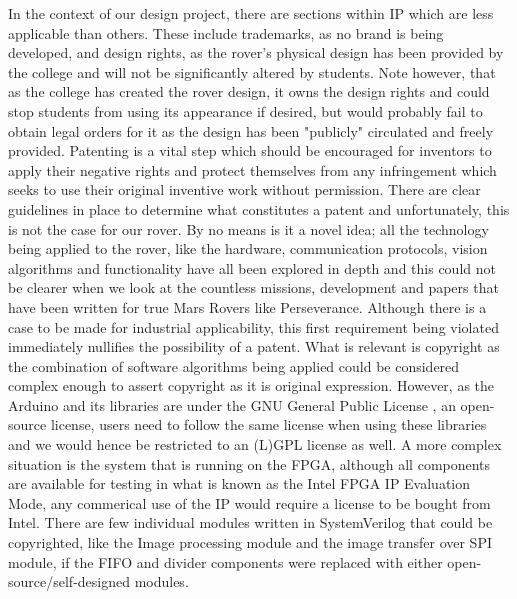 \documentclass[a4paper]{article}
\begin{document}
In the context of our design project, there are sections within IP which are less applicable than others. 
These include trademarks, as no brand is being developed, and design rights, as the rover's physical design has
been provided by the college and will not be significantly altered by students. Note however,
that as the college has created the rover design, it owns the design rights and could stop students
from using its appearance if desired, but would probably fail to obtain legal orders for it as the design
has been "publicly" circulated and freely provided.
Patenting is a vital step which should be encouraged for inventors to apply their negative rights and 
protect themselves from any infringement which seeks to use their original inventive work without permission. 
There are clear guidelines in place to determine what constitutes a patent and unfortunately, 
this is not the case for our rover. By no means is it a novel idea; all the technology being 
applied to the rover, like the hardware, communication protocols, vision algorithms and functionality 
have all been explored in depth and this could not be clearer when we look at the countless missions, 
development and papers that have been written for true Mars Rovers like Perseverance. 
Although there is a case to be made for industrial applicability, this first requirement being 
violated immediately nullifies the possibility of a patent. What is relevant is copyright as 
the combination of software algorithms being applied could be considered complex enough to assert 
copyright as it is original expression. However, as the Arduino and its libraries are under the GNU General 
Public License \cite{ArduinoLicense}, an open-source license, users need to follow the same license 
when using these libraries and we would hence be restricted to an (L)GPL license as well. A more complex 
situation is the system that is running on the FPGA, although all components are available for testing 
in what is known as the Intel FPGA IP Evaluation Mode, any commerical use of the IP would require a   
license to be bought from Intel\cite{IntelEvalMode}. There are few individual modules written in SystemVerilog that could be copyrighted, 
like the Image processing module and the image transfer over SPI module, if the FIFO and divider components were replaced
with either open-source/self-designed modules. 
\end{document}
